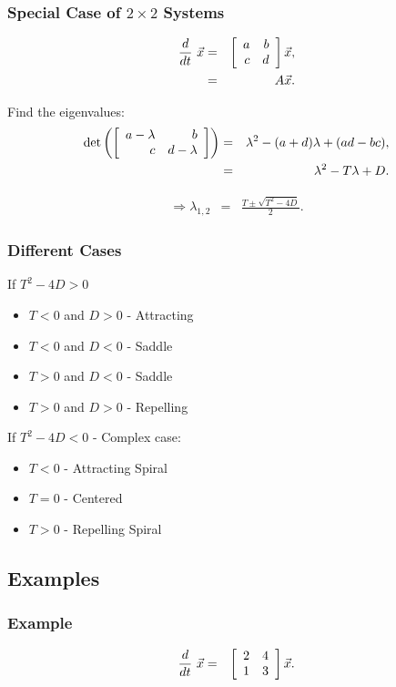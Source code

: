 \begin{frame}
  \frametitle{Special Case of $2\times 2$ Systems}

  \begin{eqnarray*}
    \deriv{~}{t} \vec{x} & = & \arrayTwo{a}{b}{c}{d} \vec{x}, \\
    & = & A \vec{x}.
  \end{eqnarray*}

  {
    Find the eigenvalues:
    \begin{eqnarray*}
      \det\lp\arrayTwo{a-\lambda}{b}{c}{d-\lambda}\rp & = & 
      \lambda^2 - (a+d) \lambda + (ad-bc), \\
      & = & \lambda^2 - T\lambda + D.
    \end{eqnarray*}
  }

  {
    \begin{eqnarray*}
      \Rightarrow \lambda_{1,2} & = & \frac{T\pm\sqrt{T^2-4D}}{2}.
    \end{eqnarray*}
  }


\end{frame}


\begin{frame}
  \frametitle{Different Cases}

  If $T^2-4D>0$
  \begin{itemize}
  \item $T<0$ and $D>0$ - Attracting
  \item $T<0$ and $D<0$ - Saddle
  \item $T>0$ and $D<0$ - Saddle
  \item $T>0$ and $D>0$ - Repelling
  \end{itemize}

  If $T^2-4D<0$ - Complex case:
  \begin{itemize}
  \item $T<0$ - Attracting Spiral
  \item $T=0$ - Centered
  \item $T>0$ - Repelling Spiral
  \end{itemize}


\end{frame}

\subsection{Examples}

\begin{frame}
  \frametitle{Example}

  \begin{eqnarray*}
    \deriv{~}{t} \vec{x} & = & \arrayTwo{2}{4}{1}{3} \vec{x}.
  \end{eqnarray*}

\end{frame}


